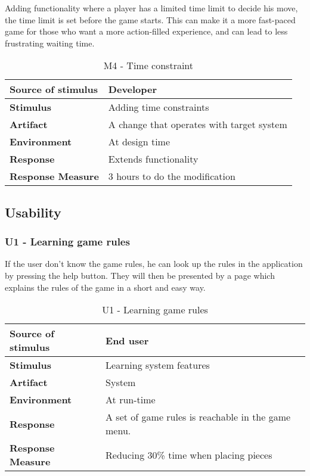 Adding functionality where a player has a limited time limit to decide his move, the time limit is set before the game starts. This can make it a more fast-paced game for those who want a more action-filled experience, and can lead to less frustrating waiting time.

\begin{table}[h!]
\begin{tabular}{ | p{110pt} | p{250pt}  |}
\hline
\bf Source of stimulus &  Developer  \\ \hline
\bf Stimulus & Adding time constraints \\ \hline 
\bf Artifact & A change that operates with target system  \\  \hline
\bf Environment & At design time \\ \hline
\bf Response & Extends functionality \\ \hline
\bf Response Measure & 3 hours to do the modification \\ \hline

\end{tabular}
\caption{M4 - Time constraint}
\end{table}

\subsection{Usability}

\subsubsection{U1 - Learning game rules}

If the user don't know the game rules, he can look up the rules in the application by pressing the help button. They will then be presented by a page which explains the rules of the game in a short and easy way.

\begin{table}[h!]
\begin{tabular}{ | p{110pt} | p{250pt}  |}
\hline
\bf Source of stimulus &  End user  \\ \hline
\bf Stimulus & Learning system features \\ \hline 
\bf Artifact & System  \\  \hline
\bf Environment & At run-time \\ \hline
\bf Response & A set of game rules is reachable in the game menu. \\ \hline
\bf Response Measure & Reducing 30\% time when placing pieces \\ \hline

\end{tabular}
\caption{U1 - Learning game rules}
\end{table}

